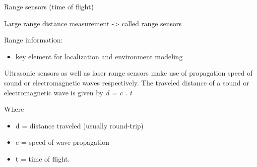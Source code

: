 \documentclass[compress]{beamer}
\begin{document}
\begin{frame}{Range sensors (time of flight)}

Large range distance measurement -\textgreater{} called range sensors

Range information:

\begin{itemize}

\item
  key element for localization and environment modeling
\end{itemize}

Ultrasonic sensors as well as laser range sensors make use of
propagation speed of sound or electromagnetic waves respectively. The
traveled distance of a sound or electromagnetic wave is given by \emph{d
= c . t}

Where

\begin{itemize}

\item
  d = distance traveled (usually round-trip)
\item
  c = speed of wave propagation
\item
  t = time of flight.
\end{itemize}

\end{frame}
\end{document}
